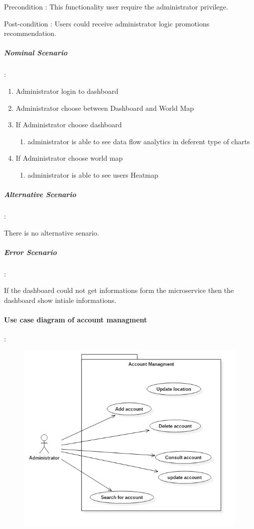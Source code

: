 Precondition : This functionality user require the administrator privilege.

Post-condition : Users could receive administrator logic promotions recommendation.

\subparagraph{Nominal Scenario} :
\label{sec:sec01}

 \begin{enumerate}
   \item Administrator login to dashboard
   \item Administrator choose between Dashboard and World Map
   \item If Administrator choose dashboard 
   \begin{enumerate}
     \item administrator is able to see data flow analytics in deferent type of charts
   \end{enumerate}
   \item If Administrator choose world map 
   \begin{enumerate}
     \item administrator is able to see users Heatmap
   \end{enumerate}
 \end{enumerate}

\subparagraph{Alternative Scenario} :
\label{sec:sec01}

There is no alternative senario.
\subparagraph{Error Scenario} :
\label{sec:sec01}

If the dashboard could not get informations form the microservice then the dashboard show intiale informations.
\paragraph{Use case diagram of account managment} :
\label{sec:sec01}

 \begin{figure}[H]
	\centering
	\includegraphics[height=0.3\textheight]{fig01/userMangment}
	\label{fig:FilialesEtClients}
\end{figure}

